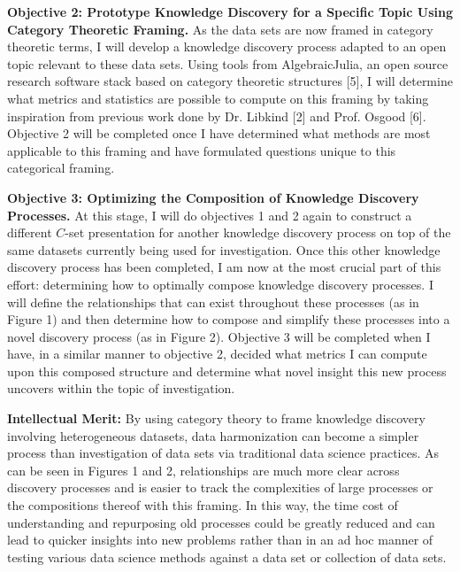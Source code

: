 \documentclass[11pt]{extarticle}
\begin{document}
\textbf{Objective 2: Prototype Knowledge Discovery for a Specific Topic Using Category Theoretic Framing.} As the data sets are now framed in category theoretic terms, I will develop a knowledge discovery process adapted to an open topic relevant to these data sets.
Using tools from AlgebraicJulia, an open source research software stack based on category theoretic structures [5], I will determine what metrics and statistics are possible to compute on this framing by taking inspiration from previous work done by Dr. Libkind [2] and Prof. Osgood [6].
Objective 2 will be completed once I have determined what methods are most applicable to this framing and have formulated questions unique to this categorical framing.

\textbf{Objective 3: Optimizing the Composition of Knowledge Discovery Processes.} At this stage, I will do objectives 1 and 2 again to construct a different $C$-set presentation for another knowledge discovery process on top of the same datasets currently being used for investigation.
Once this other knowledge discovery process has been completed, I am now at the most crucial part of this effort: determining how to optimally compose knowledge discovery processes.
I will define the relationships that can exist throughout these processes (as in Figure 1) and then determine how to compose and simplify these processes into a novel discovery process (as in Figure 2).
Objective 3 will be completed when I have, in a similar manner to objective 2, decided what metrics I can compute upon this composed structure and determine what novel insight this new process uncovers within the topic of investigation.

\textbf{Intellectual Merit:} By using category theory to frame knowledge discovery involving heterogeneous datasets, data harmonization can become a simpler process than investigation of data sets via traditional data science practices.
As can be seen in Figures 1 and 2, relationships are much more clear across discovery processes and is easier to track the complexities of large processes or the compositions thereof with this framing.
In this way, the time cost of understanding and repurposing old processes could be greatly reduced and can lead to quicker insights into new problems rather than in an ad hoc manner of testing various data science methods against a data set or collection of data sets.
\end{document}
